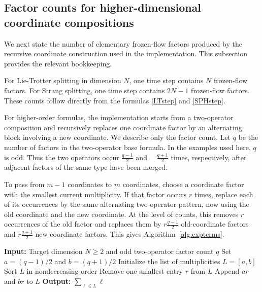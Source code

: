 \documentclass[preprint,1p,times,nopreprintline]{elsarticle}
\begin{document}
\subsection{Factor counts for higher-dimensional coordinate compositions}
\label{expHI}

We next state the number of elementary frozen-flow factors produced by the recursive coordinate construction used in the implementation. This subsection provides the relevant bookkeeping.

For Lie-Trotter splitting in dimension $N$, one time step contains $N$ frozen-flow factors. For Strang splitting, one time step contains $2N-1$ frozen-flow factors. These counts follow directly from the formulas \eqref{LTstep} and \eqref{SPHstep}.

For higher-order formulas, the implementation starts from a two-operator composition and recursively replaces one coordinate factor by an alternating block involving a new coordinate. We describe only the factor count. Let $q$ be the number of factors in the two-operator base formula. In the examples used here, $q$ is odd. Thus the two operators occur $\frac{q-1}{2}$ and $\quad\frac{q+1}{2}$ times, respectively, after adjacent factors of the same type have been merged.

To pass from $m-1$ coordinates to $m$ coordinates, choose a coordinate factor with the smallest current multiplicity. If that factor occurs $r$ times, replace each of its occurrences by the same alternating two-operator pattern, now using the old coordinate and the new coordinate. At the level of counts, this removes $r$ occurrences of the old factor and replaces them by $r\frac{q-1}{2}$ old-coordinate factors and $r\frac{q+1}{2}$ new-coordinate factors. This gives Algorithm~\ref{alg:expterms}.

\begin{algorithm}[t!]
\caption{Factor count for the recursive coordinate substitution}
\label{alg:expterms}
\begin{algorithmic}[1]
\STATE \textbf{Input:} Target dimension $N\ge 2$ and odd two-operator factor count $q$
\STATE Set $a=(q-1)/2$ and $b=(q+1)/2$
\STATE Initialize the list of multiplicities $L=[a,b]$
    \STATE Sort $L$ in nondecreasing order
    \STATE Remove one smallest entry $r$ from $L$
    \STATE Append $ar$ and $br$ to $L$
\ENDFOR
\STATE \textbf{Output:} $\sum_{\ell\in L}\ell$
\end{algorithmic}
\end{algorithm}
\end{document}
